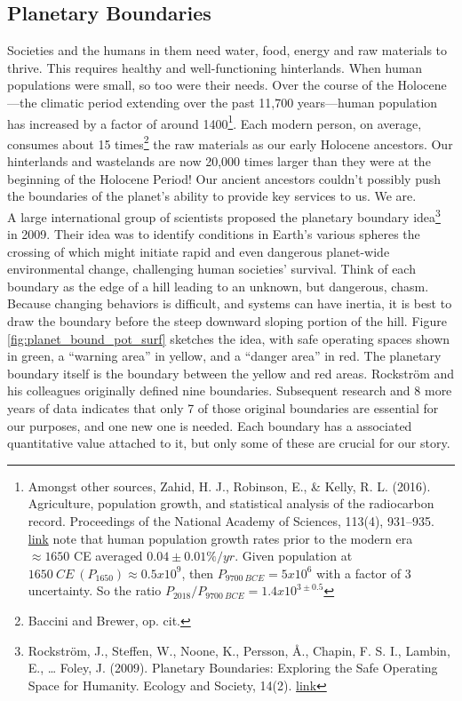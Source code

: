 \documentclass[amstex,12pt]{book}
\begin{document}
\subsection{Planetary Boundaries}\label{pbs}
Societies and the humans in them need water, food, energy and raw materials to thrive. This requires healthy and well-functioning hinterlands. When human populations were small, so too were their needs. Over the course of the Holocene---the climatic period extending over the past 11,700 years---human population has increased by a factor of around 1400\footnote{Amongst other sources, Zahid, H. J., Robinson, E., \& Kelly, R. L. (2016). Agriculture, population growth, and statistical analysis of the radiocarbon record. Proceedings of the National Academy of Sciences, 113(4), 931–935. \href{https://doi.org/10.1073/pnas.1517650112}{link} note that human population growth rates prior to the modern era $\approx1650$ CE averaged $0.04\pm0.01\%/yr$. Given population at $1650\:CE\:(P_{1650})\approx0.5x10^9$, then $P_{9700\:BCE}=5x10^6$ with a factor of 3 uncertainty. So the ratio $P_{2018}/P_{9700\:BCE}=1.4x10^{3\pm0.5}$}. Each modern person, on average, consumes about 15 times\footnote{Baccini and Brewer, op. cit.} the raw materials as our early Holocene ancestors. Our hinterlands and wastelands are now 20,000 times larger than they were at the beginning of the Holocene Period! Our ancient ancestors couldn't possibly push the boundaries of the planet's ability to provide key services to us. We are.\\

A large international group of scientists proposed the planetary boundary idea\footnote{Rockstr\"{o}m, J., Steffen, W., Noone, K., Persson, Å., Chapin, F. S. I., Lambin, E., … Foley, J. (2009). Planetary Boundaries: Exploring the Safe Operating Space for Humanity. Ecology and Society, 14(2). \href{https://doi.org/10.5751/ES-03180-140232}{link}} in 2009. Their idea was to identify conditions in Earth's various spheres the crossing of which might initiate rapid and even dangerous planet-wide environmental change, challenging human societies' survival. Think of each boundary as the edge of a hill leading to an unknown, but dangerous, chasm. Because changing behaviors is difficult, and systems can have inertia, it is best to draw the boundary before the steep downward sloping portion of the hill. Figure \ref{fig:planet_bound_pot_surf} sketches the idea, with safe operating spaces shown in green, a ``warning area'' in yellow, and a ``danger area'' in red. The planetary boundary itself is the boundary between the yellow and red areas. Rockstr\"{o}m and his colleagues originally defined nine boundaries. Subsequent research and 8 more years of data indicates that only 7 of those original boundaries are essential for our purposes, and one new one is needed. Each boundary has a associated quantitative value attached to it, but only some of these are crucial for our story.\\ 
\end{document}
